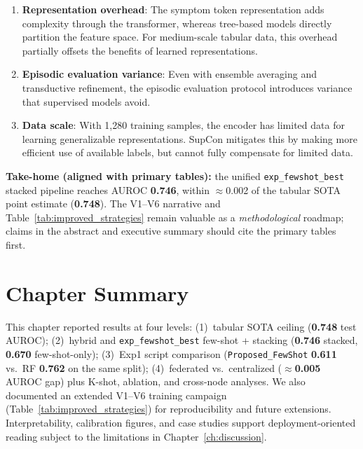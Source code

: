 \begin{enumerate}
\item \textbf{Representation overhead}: The symptom token representation adds complexity through the transformer, whereas tree-based models directly partition the feature space. For medium-scale tabular data, this overhead partially offsets the benefits of learned representations.
\item \textbf{Episodic evaluation variance}: Even with ensemble averaging and transductive refinement, the episodic evaluation protocol introduces variance that supervised models avoid.
\item \textbf{Data scale}: With 1,280 training samples, the encoder has limited data for learning generalizable representations. SupCon mitigates this by making more efficient use of available labels, but cannot fully compensate for limited data.
\end{enumerate}

\textbf{Take-home (aligned with primary tables):} the unified \texttt{exp\_fewshot\_best} stacked pipeline reaches AUROC \textbf{0.746}, within $\approx$0.002 of the tabular SOTA point estimate (\textbf{0.748}). The V1--V6 narrative and Table~\ref{tab:improved_strategies} remain valuable as a \emph{methodological} roadmap; claims in the abstract and executive summary should cite the primary tables first.

\section{Chapter Summary}

This chapter reported results at four levels: (1)~tabular SOTA ceiling (\textbf{0.748} test AUROC); (2)~hybrid and \texttt{exp\_fewshot\_best} few-shot + stacking (\textbf{0.746} stacked, \textbf{0.670} few-shot-only); (3)~Exp1 script comparison (\texttt{Proposed\_FewShot} \textbf{0.611} vs.\ RF \textbf{0.762} on the same split); (4)~federated vs.\ centralized ($\approx$\textbf{0.005} AUROC gap) plus K-shot, ablation, and cross-node analyses. We also documented an extended V1--V6 training campaign (Table~\ref{tab:improved_strategies}) for reproducibility and future extensions. Interpretability, calibration figures, and case studies support deployment-oriented reading subject to the limitations in Chapter~\ref{ch:discussion}.

